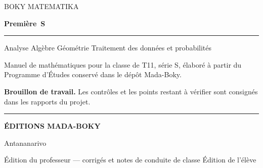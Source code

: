 \cleardoublepage
\thispagestyle{empty}
\begingroup
\raggedright
\vspace*{3.2cm}

{\sffamily\fontsize{11}{14}\selectfont\color{bmtGris} BOKY MATEMATIKA\par}
\vspace{0.5em}
{\sffamily\bfseries\fontsize{40}{44}\selectfont\color{bmtSarcelle} Première~S\par}
\vspace{0.9em}
{\color{bmtOcre}\rule{4cm}{2.6pt}\par}
\vspace{1.4em}
{\sffamily\fontsize{13}{18}\selectfont
 Analyse \quad Algèbre \quad Géométrie \quad Traitement des données et probabilités\par}

\vspace{2.6cm}
{\normalsize
 Manuel de mathématiques pour la classe de T11, série S, élaboré à partir
 du Programme d'Études conservé dans le dépôt Mada-Boky.\par
 \medskip
 \textbf{Brouillon de travail.} Les contrôles et les points restant à vérifier
 sont consignés dans les rapports du projet.\par}

\vfill

{\color{bmtSarcelle}\rule{1.4cm}{1.6pt}\par}
\vspace{0.5em}
{\sffamily\bfseries\fontsize{13}{17}\selectfont\color{bmtSarcelle} ÉDITIONS MADA-BOKY\par}
\vspace{0.3em}
{\sffamily\footnotesize\color{bmtGris} Antananarivo\par}

\vspace{1.2em}
{\sffamily\footnotesize\color{bmtGris}
 \ifbmtprof Édition du professeur — corrigés et notes de conduite de classe
 \else Édition de l'élève\fi\par}
\endgroup
\cleardoublepage
